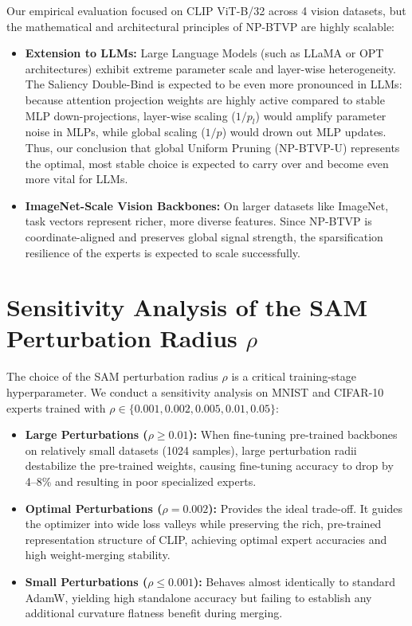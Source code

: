 Our empirical evaluation focused on CLIP ViT-B/32 across 4 vision datasets, but the mathematical and architectural principles of NP-BTVP are highly scalable:
\begin{itemize}
    \item \textbf{Extension to LLMs:} Large Language Models (such as LLaMA or OPT architectures) exhibit extreme parameter scale and layer-wise heterogeneity. The Saliency Double-Bind is expected to be even more pronounced in LLMs: because attention projection weights are highly active compared to stable MLP down-projections, layer-wise scaling ($1/p_l$) would amplify parameter noise in MLPs, while global scaling ($1/p$) would drown out MLP updates. Thus, our conclusion that global Uniform Pruning (NP-BTVP-U) represents the optimal, most stable choice is expected to carry over and become even more vital for LLMs.
    \item \textbf{ImageNet-Scale Vision Backbones:} On larger datasets like ImageNet, task vectors represent richer, more diverse features. Since NP-BTVP is coordinate-aligned and preserves global signal strength, the sparsification resilience of the experts is expected to scale successfully.
\end{itemize}

\section{Sensitivity Analysis of the SAM Perturbation Radius $\rho$}
\label{sec:appendix_sam_rho}

The choice of the SAM perturbation radius $\rho$ is a critical training-stage hyperparameter. We conduct a sensitivity analysis on MNIST and CIFAR-10 experts trained with $\rho \in \{0.001, 0.002, 0.005, 0.01, 0.05\}$:
\begin{itemize}
    \item \textbf{Large Perturbations ($\rho \geq 0.01$):} When fine-tuning pre-trained backbones on relatively small datasets (1024 samples), large perturbation radii destabilize the pre-trained weights, causing fine-tuning accuracy to drop by 4--8\% and resulting in poor specialized experts.
    \item \textbf{Optimal Perturbations ($\rho = 0.002$):} Provides the ideal trade-off. It guides the optimizer into wide loss valleys while preserving the rich, pre-trained representation structure of CLIP, achieving optimal expert accuracies and high weight-merging stability.
    \item \textbf{Small Perturbations ($\rho \le 0.001$):} Behaves almost identically to standard AdamW, yielding high standalone accuracy but failing to establish any additional curvature flatness benefit during merging.
\end{itemize}

